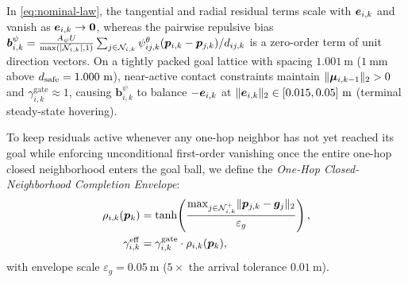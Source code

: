 In \eqref{eq:nominal-law}, the tangential and radial residual terms scale with $\boldsymbol{e}_{i,k}$ and vanish as $\boldsymbol{e}_{i,k}\to\boldsymbol 0$, whereas the pairwise repulsive bias $\boldsymbol b_{i,k}^\psi=\frac{A_\psi U}{\max(|\mathcal N_{i,k}|,1)}\sum_{j\in\mathcal N_{i,k}}\psi_{ij,k}^\theta(\boldsymbol{p}_{i,k}-\boldsymbol{p}_{j,k})/d_{ij,k}$ is a zero-order term of unit direction vectors. On a tightly packed goal lattice with spacing $1.001\ \mathrm m$ ($1\ \mathrm{mm}$ above $d_{\mathrm{safe}}=1.000\ \mathrm m$), near-active contact constraints maintain $\lVert\boldsymbol\mu_{i,k-1}\rVert_2>0$ and $\gamma_{i,k}^{\mathrm{gate}}\approx 1$, causing $\boldsymbol b_{i,k}^\psi$ to balance $-\boldsymbol{e}_{i,k}$ at $\lVert\boldsymbol{e}_{i,k}\rVert_2\in[0.015,0.05]\ \mathrm m$ (terminal steady-state hovering).

To keep residuals active whenever any one-hop neighbor has not yet reached its goal while enforcing unconditional first-order vanishing once the entire one-hop closed neighborhood enters the goal ball, we define the \emph{One-Hop Closed-Neighborhood Completion Envelope}:
\begin{equation}
\begin{split}
 \rho_{i,k}(\boldsymbol{p}_k)&=\tanh\!\left(\frac{\max_{j\in\mathcal N_{i,k}^+}\lVert\boldsymbol{p}_{j,k}-\boldsymbol{g}_j\rVert_2}{\varepsilon_g}\right),\\
 \gamma_{i,k}^{\mathrm{eff}} &= \gamma_{i,k}^{\mathrm{gate}}\cdot\rho_{i,k}(\boldsymbol{p}_k),
\end{split}\label{eq:envelope-def}
\end{equation}
with envelope scale $\varepsilon_g=0.05\ \mathrm m$ ($5\times$ the arrival tolerance $0.01\ \mathrm m$).

